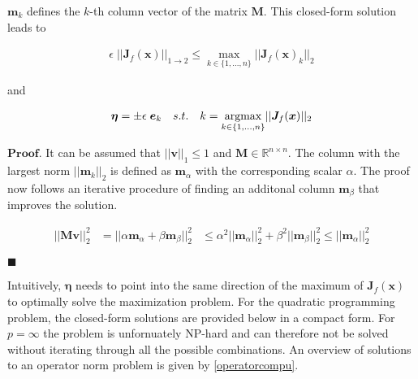 \begingroup
$\bm{m}_k$ defines the $k$-th column vector of the matrix $\bm{M}$. This closed-form solution leads to
\endgroup

\begin{equation}
\begin{aligned}
	\epsilon \; \lvert\lvert \bm{J}_f(\bm{x}) \rvert\rvert_{1 \rightarrow 2} \leq \max_{k \in \{1, ..., n\}} \lvert\lvert \bm{J}_f(\bm{x})_k \rvert\rvert_2
\end{aligned}
\label{l1solution}
\end{equation}

\begingroup
and
\endgroup

\begin{equation}
\begin{aligned}
	\bm{\eta} = \pm \epsilon \; \bm{e}_{k} \quad s.t. \quad k = \operatorname*{argmax}_{k \in \{1, ..., n\}} \lvert\lvert \bm{J}_f(\bm{x}) \rvert\rvert_2
\end{aligned}
\label{l1final}
\end{equation}


$\bm{Proof.}$ It can be assumed that $\lvert\lvert \bm{v} \rvert\rvert_1 \leq 1$ and $\bm{M} \in \mathbb{R}^{n \times n}$. The column with
the largest norm $\lvert\lvert \bm{m}_k \rvert\rvert_2$ is defined as $\bm{m}_{\alpha}$ with the corresponding scalar $\alpha$. The
proof now follows an iterative procedure of finding an additonal column $\bm{m}_{\beta}$ that improves the solution.


\begin{equation}
\begin{aligned}
	\lvert\lvert \bm{M v} \rvert\rvert_2^2 &= \lvert\lvert \alpha \bm{m}_{\alpha} + \beta \bm{m}_{\beta} \rvert\rvert_2^2
	&\leq \alpha^2 \lvert\lvert \bm{m}_{\alpha} \rvert\rvert_2^2 + \beta^2 \lvert\lvert \bm{m}_{\beta} \rvert\rvert_2^2 \leq \lvert\lvert \bm{m}_{\alpha} \rvert\rvert_2^2
\end{aligned}
\label{l1_proof}
\end{equation}

$\blacksquare$

\begingroup
Intuitively, $\bm{\eta}$ needs to point into the same direction of the maximum of $\bm{J}_f(\bm{x})$ to optimally solve the maximization problem.
For the quadratic programming problem, the closed-form solutions are provided below in a compact form. For $p = \infty$
the problem is unfornuately NP-hard and can therefore not be solved without iterating through all the possible combinations. An
overview of solutions to an operator norm problem is given by \autoref{operatorcompu}.
\endgroup

